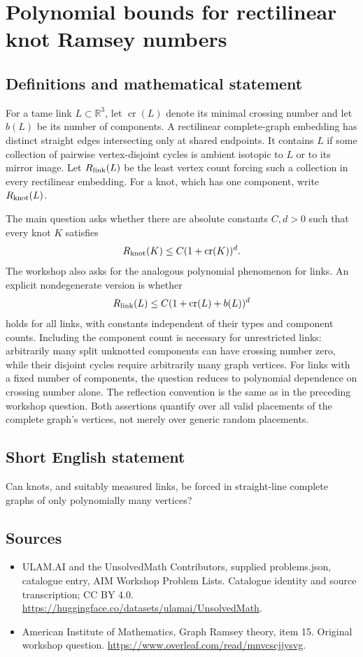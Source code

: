 \documentclass[11pt,a4paper]{article}
\begin{document}
\section*{Polynomial bounds for rectilinear knot Ramsey numbers}\label{statement}

\subsection{Definitions and mathematical statement}
For a tame link $L\subset\mathbb R^3$, let $\operatorname{cr}(L)$ denote its minimal crossing number and let $b(L)$ be its number of components.
A rectilinear complete-graph embedding has distinct straight edges intersecting only at shared endpoints.
It contains $L$ if some collection of pairwise vertex-disjoint cycles is ambient isotopic to $L$ or to its mirror image.
Let $R_{\rm link}(L)$ be the least vertex count forcing such a collection in every rectilinear embedding.
For a knot, which has one component, write $R_{\rm knot}(L)$.

The main question asks whether there are absolute constants $C,d>0$ such that every knot $K$ satisfies
\[
 R_{\rm knot}(K)\leq C(1+\operatorname{cr}(K))^d.
\]
The workshop also asks for the analogous polynomial phenomenon for links.
An explicit nondegenerate version is whether
\[
 R_{\rm link}(L)\leq C(1+\operatorname{cr}(L)+b(L))^d
\]
holds for all links, with constants independent of their types and component counts.
Including the component count is necessary for unrestricted links: arbitrarily many split unknotted components can have crossing number zero, while their disjoint cycles require arbitrarily many graph vertices.
For links with a fixed number of components, the question reduces to polynomial dependence on crossing number alone.
The reflection convention is the same as in the preceding workshop question.
Both assertions quantify over all valid placements of the complete graph's vertices, not merely over generic random placements.
\subsection{Short English statement}
Can knots, and suitably measured links, be forced in straight-line complete graphs of only polynomially many vertices?
\subsection{Sources}
\begin{itemize}
\item[S1] ULAM.AI and the UnsolvedMath Contributors, supplied problems.json, catalogue entry, AIM Workshop Problem Lists. Catalogue identity and source transcription; CC BY 4.0.
\url{https://huggingface.co/datasets/ulamai/UnsolvedMath}.
\item[S2] American Institute of Mathematics, Graph Ramsey theory, item 15. Original workshop question.
\url{https://www.overleaf.com/read/mnvcscjjysvg}.
\end{itemize}
\end{document}
